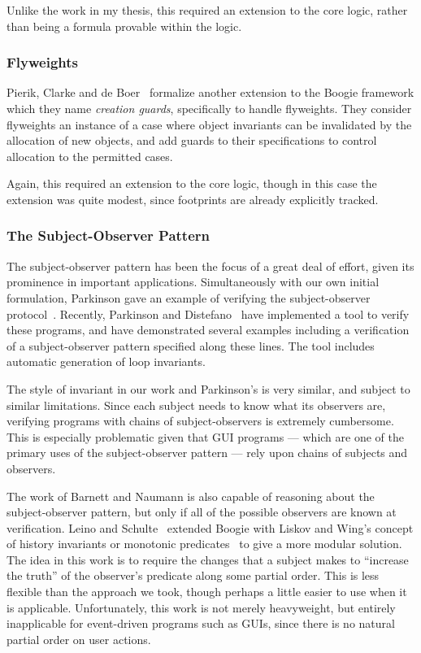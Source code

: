 Unlike the work in my thesis, this required an extension to the core
logic, rather than being a formula provable within the logic. 

\subsubsection{Flyweights}

Pierik, Clarke and de Boer~\cite{creational-invariants} formalize
another extension to the Boogie framework which they name
\emph{creation guards}, specifically to handle flyweights. They
consider flyweights an instance of a case where object invariants can
be invalidated by the allocation of new objects, and add guards to
their specifications to control allocation to the permitted cases.

Again, this required an extension to the core logic, though in this
case the extension was quite modest, since footprints are already
explicitly tracked. 

\subsubsection{The Subject-Observer Pattern}

The subject-observer pattern has been the focus of a great deal of
effort, given its prominence in important applications. Simultaneously
with our own initial formulation, Parkinson gave an example of
verifying the subject-observer
protocol~\cite{parkinson-iwaco-07}. Recently, Parkinson and
Distefano~\cite{jstar-parkinson-distefano} have implemented a tool to
verify these programs, and have demonstrated several examples
including a verification of a subject-observer pattern specified along
these lines. The tool includes automatic generation of loop
invariants.

The style of invariant in our work and Parkinson's is very similar,
and subject to similar limitations. Since each subject needs to know
what its observers are, verifying programs with chains of
subject-observers is extremely cumbersome. This is especially
problematic given that GUI programs --- which are one of the primary
uses of the subject-observer pattern --- rely upon chains of subjects
and observers.

The work of Barnett and Naumann is also capable of reasoning about the
subject-observer pattern, but only if all of the possible observers
are known at verification.  Leino and Schulte~\cite{boogie-sub-obs}
extended Boogie with Liskov and Wing's concept of history invariants
or monotonic predicates~\cite{liskov-wing} to give a more modular
solution. The idea in this work is to require the changes that a
subject makes to ``increase the truth'' of the observer's predicate
along some partial order. This is less flexible than the approach we
took, though perhaps a little easier to use when it is
applicable. Unfortunately, this work is not merely heavyweight, but
entirely inapplicable for event-driven programs such as GUIs, since
there is no natural partial order on user actions.

